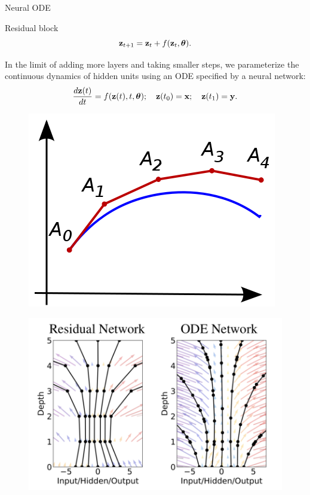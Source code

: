 \begin{frame}{Neural ODE}
	\begin{block}{Residual block}
	\vspace{-0.4cm}
	\[
	    \mathbf{z}_{t+1} = \mathbf{z}_t + f(\mathbf{z}_t, \boldsymbol{\theta}).
	\]
	\vspace{-0.4cm}
	\end{block}
	In the limit of adding more layers and taking smaller steps, we parameterize the continuous dynamics of hidden units using an ODE specified by a neural network: 
	\[
	    \frac{d \mathbf{z}(t)}{dt} = f(\mathbf{z}(t), t, \boldsymbol{\theta}); \quad \mathbf{z}(t_0) = \mathbf{x}; \quad \mathbf{z}(t_1) = \mathbf{y}.
	\]
	\begin{minipage}[t]{0.4\columnwidth}
		\begin{figure}
			\centering
			\includegraphics[width=0.8\linewidth]{figs/euler}
		\end{figure}
	\end{minipage}%
	\begin{minipage}[t]{0.6\columnwidth}
		\vspace{-0.4cm}
		\begin{figure}
			\centering
			\includegraphics[width=0.9\linewidth]{figs/resnet_vs_neural_ode.png}
		\end{figure}
	\end{minipage}

\end{frame}

